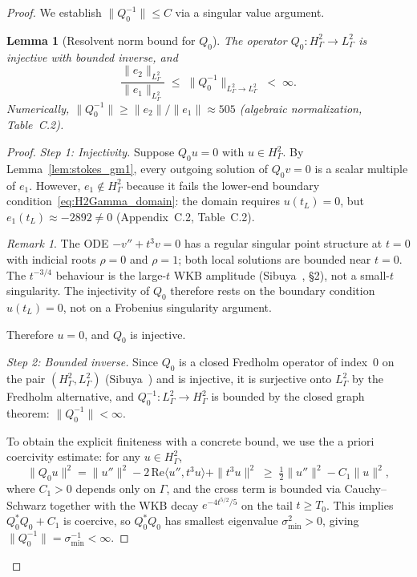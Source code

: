 \documentclass[12pt,a4paper]{amsart}
\newtheorem{lemma}[theorem]{Lemma}
\theoremstyle{remark}
\newtheorem{remark}[theorem]{Remark}
\begin{document}
\begin{proof}
We establish $\|Q_0^{-1}\| \leq C$ via a singular value argument.

\begin{lemma}[Resolvent norm bound for $Q_0$]
\label{lem:Q0_svd}
The operator $Q_0 : H^2_\Gamma \to L^2_\Gamma$ is injective with bounded inverse,
and
\[
  \frac{\|e_2\|_{L^2_\Gamma}}{\|e_1\|_{L^2_\Gamma}}
  \;\leq\; \|Q_0^{-1}\|_{L^2_\Gamma \to L^2_\Gamma}
  \;<\; \infty.
\]
Numerically, $\|Q_0^{-1}\| \geq \|e_2\|/\|e_1\| \approx 505$
(algebraic normalization, Table~C.2).
\end{lemma}

\begin{proof}
\emph{Step 1: Injectivity.}
Suppose $Q_0 u = 0$ with $u \in H^2_\Gamma$.
By Lemma~\ref{lem:stokes_gm1}, every outgoing solution of $Q_0 v = 0$
is a scalar multiple of $e_1$.
However, $e_1 \notin H^2_\Gamma$ because it fails the lower-end boundary
condition~\eqref{eq:H2Gamma_domain}: the domain requires $u(t_L) = 0$,
but $e_1(t_L) \approx -2892 \neq 0$ (Appendix~C.2, Table~C.2).

\begin{remark}
The ODE $-v''+t^3 v = 0$ has a regular singular point structure at $t=0$
with indicial roots $\rho = 0$ and $\rho = 1$; both local solutions are bounded
near $t = 0$. The $t^{-3/4}$ behaviour is the large-$t$ WKB amplitude
(Sibuya~\cite{Sibuya75}, \S2), not a small-$t$ singularity.
The injectivity of $Q_0$ therefore rests on the boundary condition $u(t_L)=0$,
not on a Frobenius singularity argument.
\end{remark}

Therefore $u = 0$, and $Q_0$ is injective.

\emph{Step 2: Bounded inverse.}
Since $Q_0$ is a closed Fredholm operator of index~$0$ on the pair
$(H^2_\Gamma, L^2_\Gamma)$ (Sibuya~\cite{Sibuya75}) and is injective,
it is surjective onto $L^2_\Gamma$ by the Fredholm alternative,
and $Q_0^{-1} : L^2_\Gamma \to H^2_\Gamma$ is bounded by the closed graph theorem:
$\|Q_0^{-1}\| < \infty$.

To obtain the explicit finiteness with a concrete bound, we use the
a priori coercivity estimate: for any $u \in H^2_\Gamma$,
\begin{equation}\label{eq:coercive}
  \|Q_0 u\|^2
  = \|u''\|^2 - 2\,\mathrm{Re}\langle u'', t^3 u\rangle + \|t^3 u\|^2
  \;\geq\; \tfrac{1}{2}\|u''\|^2 - C_1\|u\|^2,
\end{equation}
where $C_1 > 0$ depends only on $\Gamma$, and the cross term is bounded via
Cauchy--Schwarz together with the WKB decay $e^{-4t^{5/2}/5}$ on the tail
$t \geq T_0$. This implies $Q_0^* Q_0 + C_1$ is coercive, so $Q_0^* Q_0$
has smallest eigenvalue $\sigma_{\min}^2 > 0$, giving
$\|Q_0^{-1}\| = \sigma_{\min}^{-1} < \infty$.


\end{proof}
\end{proof}
\end{document}
